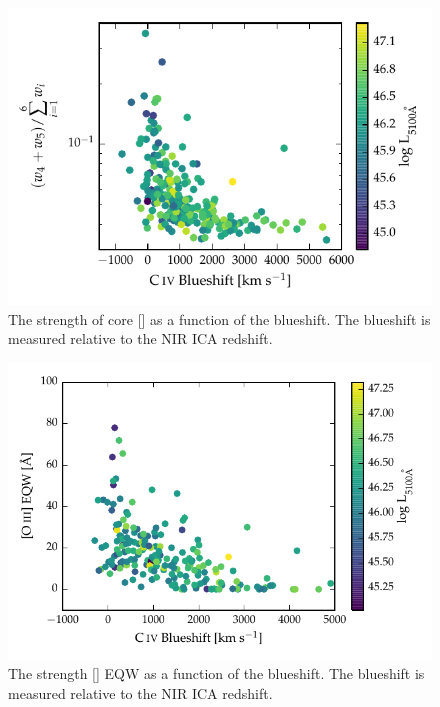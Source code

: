 \begin{figure}
    \centering
    \includegraphics[width=\textwidth]{figures/chapter04/civ_blueshift_oiii_strength.pdf} 
    \caption{The strength of core [] as a function of the  blueshift. The  blueshift is measured relative to the NIR \ac{ICA} redshift.}     
    \label{fig:civ_blueshift_oiii_strength}
\end{figure}

\begin{figure}
    \centering
    \includegraphics[width=\textwidth]{figures/chapter04/civ_blueshift_oiii_eqw.pdf} 
    \caption{The strength [] EQW as a function of the  blueshift. The  blueshift is measured relative to the NIR \ac{ICA} redshift.}     
    \label{fig:civ_blueshift_oiii_eqw}
\end{figure}

